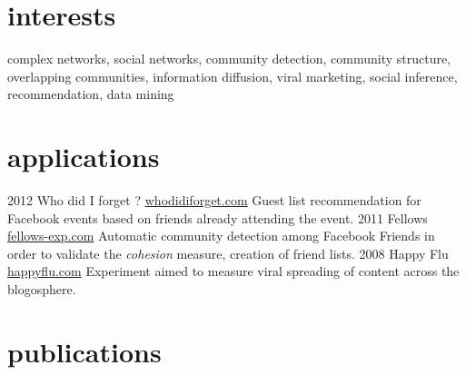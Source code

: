 \documentclass[]{roger-cv}
\begin{document}
\section{interests}

complex networks, social networks, community detection, community structure,
overlapping communities, information diffusion, viral marketing, social
inference, recommendation, data mining

\section{applications}

\begin{entrylist}
  \entry
    {2012}
    {}
    {Who did I forget ?}
    {\href{http://whodidiforget.com}{whodidiforget.com}}
    {Guest list recommendation for Facebook events based on friends already attending the event.}
  \entry
    {2011}
    {}
    {Fellows}
    {\href{http://fellows-exp.com}{fellows-exp.com}}
    {Automatic community detection among Facebook Friends in order to validate the \emph{cohesion} measure, creation of friend lists.}
  \entry
    {2008}
    {}
    {Happy Flu}
    {\href{http://happyflu.com}{happyflu.com}}
    {Experiment aimed to measure viral spreading of content across the blogosphere.}
\end{entrylist}

\section{publications}


\begin{refsection}
  \nocite{*}
  \printbibliography[sorting=chronological, type=inproceedings, title={international peer-reviewed conferences/proceedings}, notkeyword={france}, heading=subbibliography]
\end{refsection}
\begin{refsection}
  \nocite{*}
  \printbibliography[sorting=chronological, type=inproceedings, title={local peer-reviewed conferences/proceedings}, keyword={france}, heading=subbibliography]
\end{refsection}
\end{document}
